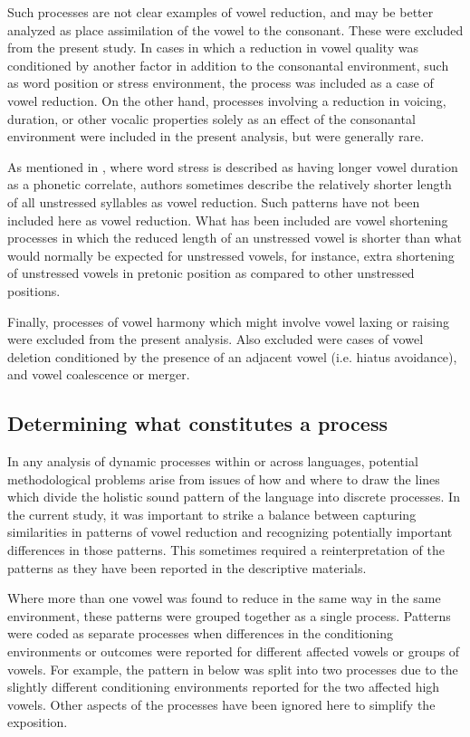 Such processes are not clear examples of vowel reduction, and may be better analyzed as place assimilation of the vowel to the consonant. These were excluded from the present study. In cases in which a reduction in vowel quality was conditioned by another factor in addition to the consonantal environment, such as word position or stress environment, the process was included as a case of vowel reduction. On the other hand, processes involving a reduction in voicing, duration, or other vocalic properties solely as an effect of the consonantal environment were included in the present analysis, but were generally rare.

  As mentioned in , where word stress is described as having longer vowel duration as a phonetic correlate, authors sometimes describe the relatively shorter length of all unstressed syllables as vowel reduction. Such patterns have not been included here as vowel reduction. What has been included are vowel shortening processes in which the reduced length of an unstressed vowel is shorter than what would normally be expected for unstressed vowels, for instance, extra shortening of unstressed vowels in pretonic position as compared to other unstressed positions.

  Finally, processes of vowel harmony which might involve vowel laxing or raising were excluded from the present analysis. Also excluded were cases of vowel deletion conditioned by the presence of an adjacent vowel (i.e. hiatus avoidance), and vowel coalescence or merger.

\subsection{Determining what constitutes a process}\label{sec:6.2.2}

  In any analysis of dynamic processes within or across languages, potential methodological problems arise from issues of how and where to draw the lines which divide the holistic sound pattern of the language into discrete processes. In the current study, it was important to strike a balance between capturing similarities in patterns of vowel reduction and recognizing potentially important differences in those patterns. This sometimes required a reinterpretation of the patterns as they have been reported in the descriptive materials.

  Where more than one vowel was found to reduce in the same way in the same environment, these patterns were grouped together as a single process. Patterns were coded as separate processes when differences in the conditioning environments or outcomes were reported for different affected vowels or groups of vowels. For example, the pattern in  below was split into two processes due to the slightly different conditioning environments reported for the two affected high vowels. Other aspects of the processes have been ignored here to simplify the exposition.

